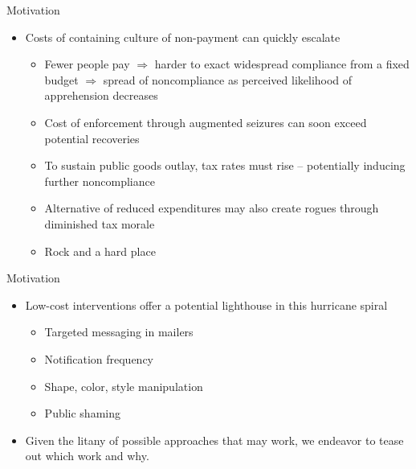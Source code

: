 \documentclass[ignorenonframetext,]{beamer}
\begin{document}
\begin{frame}{Motivation}

\begin{itemize}
\item
  Costs of containing culture of non-payment can quickly escalate

  \begin{itemize}
  \item
    Fewer people pay \(\Rightarrow\) harder to exact widespread
    compliance from a fixed budget \(\Rightarrow\) spread of
    noncompliance as perceived likelihood of apprehension decreases
  \item
    Cost of enforcement through augmented seizures can soon exceed
    potential recoveries
  \item
    To sustain public goods outlay, tax rates must rise -- potentially
    inducing further noncompliance
  \item
    Alternative of reduced expenditures may also create rogues through
    diminished tax morale
  \item
    Rock and a hard place
  \end{itemize}
\end{itemize}

\end{frame}

\begin{frame}{Motivation}

\begin{itemize}
\item
  Low-cost interventions offer a potential lighthouse in this hurricane
  spiral

  \begin{itemize}
  \item
    Targeted messaging in mailers
  \item
    Notification frequency
  \item
    Shape, color, style manipulation
  \item
    Public shaming
  \end{itemize}
\item
  Given the litany of possible approaches that may work, we endeavor to
  tease out which work and why.
\end{itemize}

\end{frame}
\end{document}
